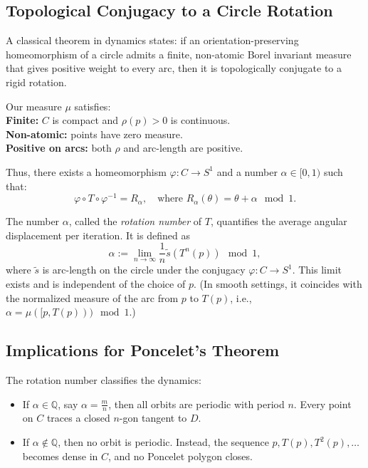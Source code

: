\begin{technical}
\subsection*{Topological Conjugacy to a Circle Rotation}
A classical theorem in dynamics states: if an orientation-preserving homeomorphism of a circle admits a finite, non-atomic Borel invariant measure that gives positive weight to every arc, then it is topologically conjugate to a rigid rotation.

Our measure \( \mu \) satisfies:\\
\textbf{Finite:} \( C \) is compact and \( \rho(p) > 0 \) is continuous.\\
\textbf{Non-atomic:} points have zero measure.\\
\textbf{Positive on arcs:} both \( \rho \) and arc-length are positive.

Thus, there exists a homeomorphism \( \varphi: C \to S^1 \) and a number \( \alpha \in [0,1) \) such that:
\[
\varphi \circ T \circ \varphi^{-1} = R_\alpha, \quad \text{where } R_\alpha(\theta) = \theta + \alpha \mod 1.
\]

The number \( \alpha \), called the \emph{rotation number} of \( T \), quantifies the average angular displacement per iteration. It is defined as
\[
\alpha := \lim_{n \to \infty} \frac{1}{n} \tilde{s}(T^n(p)) \mod 1,
\]
where \( \tilde{s} \) is arc-length on the circle under the conjugacy \( \varphi: C \to S^1 \). This limit exists and is independent of the choice of \( p \). (In smooth settings, it coincides with the normalized measure of the arc from \( p \) to \( T(p) \), i.e., \( \alpha = \mu([p, T(p))) \mod 1 \).)

\subsection*{Implications for Poncelet’s Theorem}

The rotation number classifies the dynamics:
\begin{itemize}
  \item If \( \alpha \in \mathbb{Q} \), say \( \alpha = \frac{m}{n} \), then all orbits are periodic with period \( n \). Every point on \( C \) traces a closed \( n \)-gon tangent to \( D \).
  \item If \( \alpha \notin \mathbb{Q} \), then no orbit is periodic. Instead, the sequence \( p, T(p), T^2(p), \ldots \) becomes dense in \( C \), and no Poncelet polygon closes.
\end{itemize}


\end{technical}
